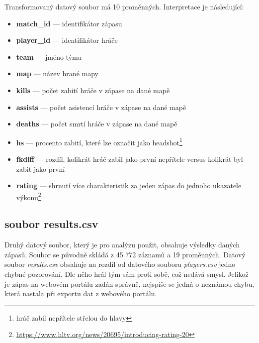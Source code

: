 \newpage
Transformovaný 
{\color{red}
datový soubor
}
má 10 proměnných. Interpretace je následující:
\begin{itemize}
    \item \textbf{match\_id} --- identifikátor zápasu
    \item \textbf{player\_id} --- identifikátor hráče
    \item \textbf{team} --- jméno týmu
    \item \textbf{map} --- název hrané mapy
    \item \textbf{kills} --- počet zabití hráče v zápase na dané mapě
    \item \textbf{assists} --- počet asistencí hráče v zápase na dané mapě
    \item \textbf{deaths} --- počet smrtí hráče v zápase na dané mapě
    \item \textbf{hs} --- procento zabití, které lze označit jako headshot\footnote{hráč zabil nepřítele střelou do hlavy}
    \item \textbf{fkdiff} --- rozdíl, kolikrát hráč zabil jako první nepřítele versus kolikrát byl zabit jako první
    \item \textbf{rating} --- shrnutí více charakteristik za jeden zápas do jednoho ukazatele výkonu\footnote{\url{https://www.hltv.org/news/20695/introducing-rating-20}}
\end{itemize}

\subsection{soubor results.csv}
Druhý datový soubor, který je pro analýzu použit, obsahuje výsledky daných zápasů. Soubor se původně skládá z 45 772 záznamů a 19 proměnných. Datový soubor 
\textit{results.csv} obsahuje na rozdíl od datového souboru \textit{players.csv} jedno chybné pozorování. Dle něho hrál tým sám proti sobě, což nedává smysl.
Jelikož je zápas na webovém portálu zadán správně, nejspíše se jedná o neznámou chybu, která nastala při exportu dat z webového portálu.

